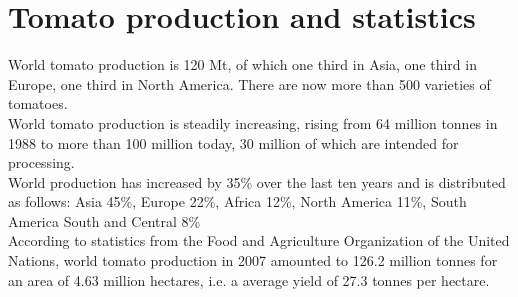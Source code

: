 \section{Tomato production and statistics }
World tomato production is 120 Mt, of which one third in Asia, one third in Europe, one third in North America. There are now more than 500 varieties of tomatoes.\\

World tomato production is steadily increasing, rising from 64 million tonnes in 1988 to more than 100 million today, 30 million of which are intended for processing.\\

World production has increased by 35\% over the last ten years and is distributed as follows: Asia 45\%, Europe 22\%, Africa 12\%, North America 11\%, South America South and Central 8\%\\

According to statistics from the Food and Agriculture Organization of the United Nations, world tomato production in 2007 amounted to 126.2 million tonnes for an area of 4.63 million hectares, i.e. a average yield of 27.3 tonnes per hectare. 

